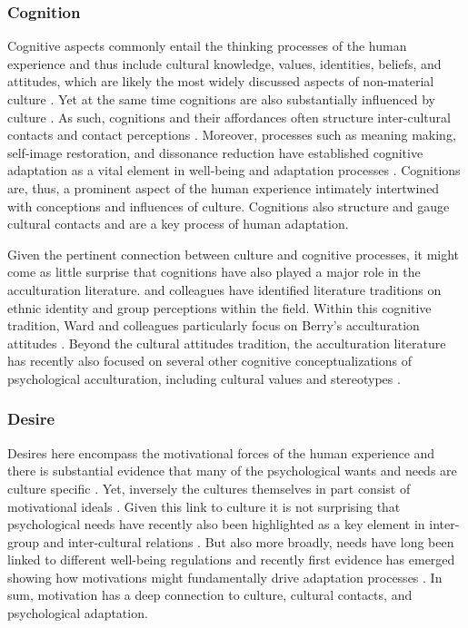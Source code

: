 \documentclass[man, 12pt, a4paper]{apa7}
\begin{document}
\subsubsection{Cognition}
Cognitive aspects commonly entail the thinking processes of the human experience and thus include cultural knowledge, values, identities, beliefs, and attitudes, which are likely the most widely discussed aspects of non-material culture \citep[e.g.,][]{DiMaggio1997}. Yet at the same time cognitions are also substantially influenced by culture \citep[e.g.,][]{Gelfand2011, Nisbett2002}. As such, cognitions and their affordances often structure inter-cultural contacts \citep[e.g., values;][]{Ramstead2016} and contact perceptions \citep[e.g., out-group attitudes;][]{Stephan2000a}. Moreover, processes such as meaning making, self-image restoration, and dissonance reduction have established cognitive adaptation as a vital element in well-being and adaptation processes \citep[e.g.,][]{Czajkowska2017}. Cognitions are, thus, a prominent aspect of the human experience intimately intertwined with conceptions and influences of culture. Cognitions also structure and gauge cultural contacts and are a key process of human adaptation.

Given the pertinent connection between culture and cognitive processes, it might come as little surprise that cognitions have also played a major role in the acculturation literature. \citet{Ward2001} and colleagues have identified literature traditions on ethnic identity and group perceptions within the field. Within this cognitive tradition, Ward and colleagues particularly focus on Berry's \citeyear{Berry1997b} acculturation attitudes \citep{Ward2019}. Beyond the cultural attitudes tradition, the acculturation literature has recently also focused on several other cognitive conceptualizations of psychological acculturation, including cultural values \citep[e.g.,][]{Marin2003} and stereotypes \citep[e.g.,][]{Stanciu2018}. 

\subsubsection{Desire}
Desires here encompass the motivational forces of the human experience and there is substantial evidence that many of the psychological wants and needs are culture specific \citep[e.g.,][]{McInerney2016, Morling2017}. Yet, inversely the cultures themselves in part consist of motivational ideals \citep[or oughts; e.g., see][]{Markus1991}. Given this link to culture it is not surprising that psychological needs have recently also been highlighted as a key element in inter-group and inter-cultural relations \citep{Dovidio2017, Kitayama2007, Hassler2021, Shnabel2008a}. But also more broadly, needs have long been linked to different well-being regulations \citep[e.g.,][]{Steverink2006} and recently first evidence has emerged showing how motivations might fundamentally drive adaptation processes \citep{Dignath2020}. 
In sum, motivation has a deep connection to culture, cultural contacts, and psychological adaptation.
\end{document}
